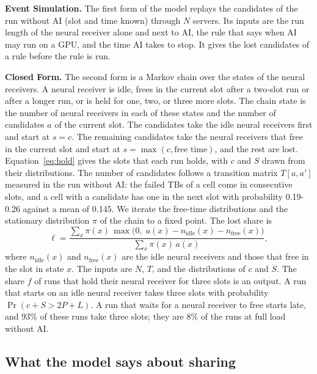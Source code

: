 \documentclass[acmsmall,screen,review,anonymous]{acmart}
\begin{document}
\noindent\textbf{Event Simulation.} The first form of the model replays the candidates of the run without AI
(slot and time known) through $N$ servers. Its inputs are the run length of the neural receiver alone and
next to AI, the rule that says when AI may run on a GPU, and the time AI takes to stop. It gives the lost
candidates of a rule before the rule is run.

\noindent\textbf{Closed Form.} The second form is a Markov chain over the states of the neural receivers. A
neural receiver is idle, frees in the current slot after a two-slot run or after a longer run, or is held
for one, two, or three more slots. The chain state is the number of neural receivers in each of these
states and the number of candidates $a$ of the current slot. The candidates take the idle neural receivers
first and start at $s = c$. The remaining candidates take the neural receivers that free in the current
slot and start at $s = \max(c, \text{free time})$, and the rest are lost. Equation~\ref{eq:hold} gives the
slots that each run holds, with $c$ and $S$ drawn from their distributions. The number of candidates
follows a transition matrix $T[a, a']$ measured in the run without AI: the failed TBs of a cell come in
consecutive slots, and a cell with a candidate has one in the next slot with probability 0.19-0.26 against
a mean of 0.145. We iterate the free-time distributions and the stationary distribution $\pi$ of the chain
to a fixed point. The lost share is
\begin{equation}
\ell = \frac{\sum_{x} \pi(x)\,\max\!\big(0,\; a(x) - n_{\mathrm{idle}}(x) - n_{\mathrm{free}}(x)\big)}{\sum_{x} \pi(x)\, a(x)},
\label{eq:loss}
\end{equation}
where $n_{\mathrm{idle}}(x)$ and $n_{\mathrm{free}}(x)$ are the idle neural receivers and those that free
in the slot in state $x$. The inputs are $N$, $T$, and the distributions of $c$ and $S$. The share $f$ of
runs that hold their neural receiver for three slots is an output. A run that starts on an idle neural
receiver takes three slots with probability $\Pr(c + S > 2P + L)$. A run that waits for a neural receiver to
free starts late, and 93\% of these runs take three slots; they are 8\% of the runs at full load without AI.

\subsection{What the model says about sharing}
\end{document}
